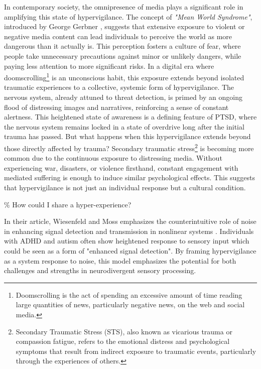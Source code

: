 In contemporary society, the omnipresence of media plays a significant role in amplifying this state of hypervigilance. The concept of \textit{"Mean World Syndrome"}, introduced by George Gerbner \citep{wiki:meanworld}, suggests that extensive exposure to violent or negative media content can lead individuals to perceive the world as more dangerous than it actually is. This perception fosters a culture of fear, where people take unnecessary precautions against minor or unlikely dangers, while paying less attention to more significant risks. In a digital era where doomscrolling\footnote{Doomscrolling is the act of spending an excessive amount of time reading large quantities of news, particularly negative news, on the web and social media.} is an unconscious habit, this exposure extends beyond isolated traumatic experiences to a collective, systemic form of hypervigilance. The nervous system, already attuned to threat detection, is primed by an ongoing flood of distressing images and narratives, reinforcing a sense of constant alertness.
% 
This heightened state of awareness is a defining feature of PTSD, where the nervous system remains locked in a state of overdrive long after the initial trauma has passed. But what happens when this hypervigilance extends beyond those directly affected by trauma? Secondary traumatic stress\footnote{Secondary Traumatic Stress (STS), also known as vicarious trauma or compassion fatigue, refers to the emotional distress and psychological symptoms that result from indirect exposure to traumatic events, particularly through the experiences of others.} is becoming more common due to the continuous exposure to distressing media. Without experiencing war, disasters, or violence firsthand, constant engagement with mediated suffering is enough to induce similar psychological effects. This suggests that hypervigilance is not just an individual response but a cultural condition.

{\scriptsize \textcolor{comment}{\%  How could I share a hyper-experience?}}

In their article, Wiesenfeld and Moss emphasizes the counterintuitive role of noise in enhancing signal detection and transmission in nonlinear systems \citep{wiesenfeld1995}. Individuals with ADHD and autism often show heightened response to sensory input which could be seen as a form of "enhanced signal detection". By framing hypervigilance as a system response to noise, this model emphasizes the potential for both challenges and strengths in neurodivergent sensory processing.

